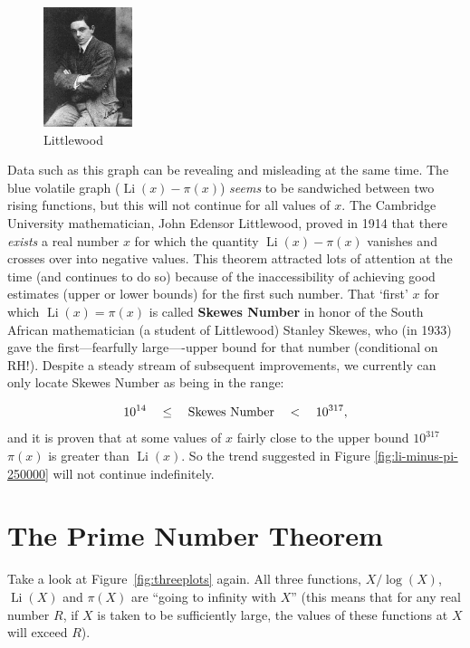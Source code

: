\documentclass[openany]{book}
\DeclareMathOperator{\Li}{Li}
\theoremstyle{plain}
\theoremstyle{definition}
\begin{document}
{{%
\begin{figure}
    \includegraphics[width=0.23\textwidth]{illustrations/littlewood}\\
    Littlewood
\end{figure}
Data such as this graph can be revealing and misleading at the same time.  The blue volatile graph ($\Li(x)-\pi(x)$) {\it seems} to be sandwiched between two rising functions, but this will not continue for all values of $x$.  The Cambridge University mathematician, John Edensor Littlewood, proved in 1914 that there {\it exists} a real number $x$ for which the quantity $\Li(x)-\pi(x)$ vanishes and crosses over into negative values.  This theorem attracted lots of attention at the time (and continues to do so) because of the inaccessibility of achieving good estimates (upper or lower bounds) for the first such number.  That `first' $x$ for which   $\Li(x) =\pi(x)$ is called {\bf Skewes Number} in honor of the South African mathematician (a student of Littlewood)  Stanley Skewes, who (in 1933) gave the  first---fearfully large----upper bound for that number (conditional on RH!).  Despite a steady stream of subsequent improvements, we currently can only  locate Skewes Number  as being in the range:

$$
10^{14}\ \ \ \le\ \ \ {\rm Skewes\ Number}\ \ \ <\ \ \    10^{317},
$$ and it is proven that at some  values of $x$ fairly close to the upper bound $10^{317}$   $\pi(x)$ is greater than $\Li(x)$. So  the trend suggested in Figure \ref{fig:li-minus-pi-250000} will not continue indefinitely.






\chapter{The Prime Number Theorem\label{sec:pnt}}

Take a look at Figure~\ref{fig:threeplots} again.  All three functions, $X/\log(X)$,
$\Li(X)$ and $\pi(X)$ are ``going to infinity with $X$'' (this means
that for any real number $R$, if $X$ is taken to be sufficiently
large, the values of these functions at $X$ will exceed $R$).

}}
\end{document}

